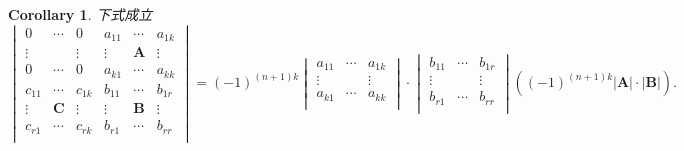 \documentclass{article}
\newtheorem{corollary}[theorem]{Corollary}
\newcommand{\mbf}[1]{\bm{#1}}
\begin{document}
\begin{corollary}
\rm 下式成立
$$
\begin{vmatrix}
0 & \cdots & 0 & a_{11} &\cdots &a_{1k} \\
 \vdots &  &\vdots& \vdots & \mbf{A} & \vdots \\
0 & \cdots & 0 & a_{k1} &\cdots& a_{kk}  \\
c_{11} &\cdots &c_{1k} & b_{11} & \cdots & b_{1r} \\
\vdots & \mbf{C} & \vdots & \vdots & \mbf{B} &\vdots \\
c_{r1} &\cdots& c_{rk} & b_{r1} & \cdots & b_{rr} \\
\end{vmatrix} = (-1)^{(n+1)k}
\begin{vmatrix}
a_{11} &\cdots &a_{1k} \\
\vdots & & \vdots  \\
a_{k1} &\cdots& a_{kk} \\
\end{vmatrix} \cdot
\begin{vmatrix}
b_{11} &\cdots &b_{1r} \\
\vdots & & \vdots  \\
b_{r1} &\cdots& b_{rr} \\
\end{vmatrix}((-1)^{(n+1)k}|\mbf{A}|\cdot|\mbf{B}|).
$$ 
\end{corollary}


\newpage
\end{document}
